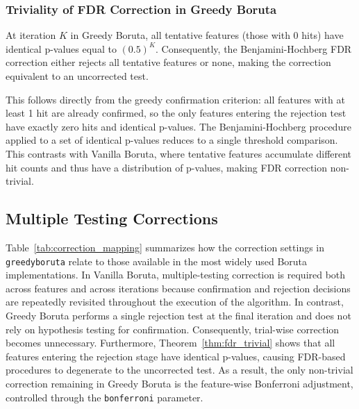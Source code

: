 \documentclass[runningheads]{llncs}
\begin{document}
\subsubsection{Triviality of FDR Correction in Greedy Boruta}

\begin{theorem}
\label{thm:fdr_trivial}
At iteration $K$ in Greedy Boruta, all tentative features (those with 0 hits) have identical p-values equal to $(0.5)^K$. Consequently, the Benjamini-Hochberg FDR correction \cite{benjamini1995controlling} either rejects all tentative features or none, making the correction equivalent to an uncorrected test.
\end{theorem}

This follows directly from the greedy confirmation criterion: all features with at least 1 hit are already confirmed, so the only features entering the rejection test have exactly zero hits and identical p-values. The Benjamini-Hochberg procedure \cite{benjamini1995controlling} applied to a set of identical p-values reduces to a single threshold comparison. This contrasts with Vanilla Boruta, where tentative features accumulate different hit counts and thus have a distribution of p-values, making FDR correction non-trivial.

\subsection{Multiple Testing Corrections}
\label{sec:method:corrections}


Table~\ref{tab:correction_mapping} summarizes how the correction settings in \texttt{greedyboruta} relate to those available in the most widely used Boruta implementations. In Vanilla Boruta, multiple-testing correction is required both across features and across iterations because confirmation and rejection decisions are repeatedly revisited throughout the execution of the algorithm. In contrast, Greedy Boruta performs a single rejection test at the final iteration and does not rely on hypothesis testing for confirmation. Consequently, trial-wise correction becomes unnecessary. Furthermore, Theorem~\ref{thm:fdr_trivial} shows that all features entering the rejection stage have identical p-values, causing FDR-based procedures to degenerate to the uncorrected test. As a result, the only non-trivial correction remaining in Greedy Boruta is the feature-wise Bonferroni adjustment, controlled through the \texttt{bonferroni} parameter.
\end{document}
